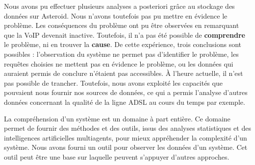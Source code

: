 Nous avons pu effectuer plusieurs analyses a posteriori grâce au stockage des données sur Asteroid. Nous n'avons toutefois pas pu mettre en évidence le problème. Les conséquences du problème ont pu être observées en remarquant que la VoIP devenait inactive. Toutefois, il n'a pas été possible de \textbf{comprendre} le problème, ni en trouver la \textbf{cause}. De cette expérience, trois conclusions sont possibles : l'observation du système ne permet pas d'identifier le problème, les requêtes choisies ne mettent pas en évidence le problème, ou les données qui auraient permis de conclure n'étaient pas accessibles. À l'heure actuelle, il n'est pas possible de trancher. Toutefois, nous avons exploité les capacités que pouvaient nous fournir nos sources de données, ce qui a permis l'analyse d'autres données concernant la qualité de la ligne ADSL au cours du temps par exemple.

La compréhension d'un système est un domaine à part entière. Ce domaine permet de fournir des méthodes et des outils, issus des analyses statistiques et des intelligences artificielles multiagents, pour mieux appréhender la complexité d'un système. Nous avons fourni un outil pour observer les données d'un système. Cet outil peut être une base sur laquelle peuvent s'appuyer d'autres approches.
